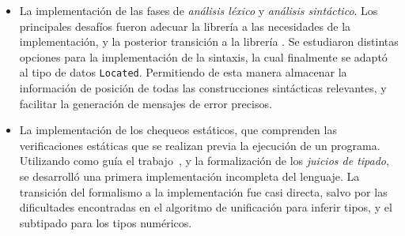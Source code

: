 \begin{itemize}
\item
La implementación de las fases de \textit{análisis léxico} y \textit{análisis sintáctico}.
Los principales desafíos fueron adecuar la librería \Parsec{} a las necesidades de la implementación, y la posterior transición a la librería \Megaparsec{}.
Se estudiaron distintas opciones para la implementación de la sintaxis, la cual finalmente se adaptó al tipo de datos \lstinline[style = haskell]{Located}.
Permitiendo de esta manera almacenar la información de posición de todas las construcciones sintácticas relevantes, y facilitar la generación de mensajes de error precisos.
\item
La implementación de los chequeos estáticos, que comprenden las verificaciones estáticas que se realizan previa la ejecución de un programa.
Utilizando como guía el trabajo~\cite{MonadicTC}, y la formalización de los \textit{juicios de tipado}, se desarrolló una primera implementación incompleta del lenguaje.
La transición del formalismo a la implementación fue casi directa, salvo por las dificultades encontradas en el algoritmo de unificación para inferir tipos, y el subtipado para los tipos numéricos.

\iffalse
Se empleó la mónada \lstinline[style = haskell]{RWST} para diseñar los chequeos estáticos del proyecto; donde el \textit{estado} consistía de los contextos formalizados, el \textit{entorno} indica el alcance de análisis actual, y la \textit{salida} es el listado de advertencias generadas durante el análisis.
\fi
\end{itemize}

